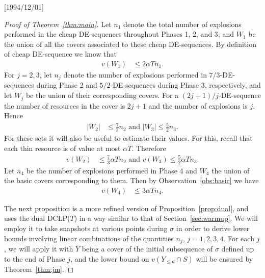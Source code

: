\NeedsTeXFormat{LaTeX2e}[1994/12/01]\documentclass[letterpaper, 11pt]{article}
\theoremstyle{definition}
\theoremstyle{remark}
\numberwithin{equation}{section}
\begin{document}
\begin{proof}[Proof of Theorem~\ref{thm:main}]
Let $n_1$ denote the total number of explosions performed in the cheap
DE-sequences throughout Phases 1, 2, and 3, and
$W_1$ be the union of all the covers associated to these cheap
DE-sequences. By definition of cheap DE-sequence
we know that
\begin{align}\label{eq:W1}
  v(W_1) & \leq 2\alpha T n_1.
           \end{align}
For $j=2,3$, let  $n_j$ denote the number of explosions performed in
$7/3$-DE-sequences during Phase 2 and $5/2$-DE-sequences during Phase
3, respectively, and let $W_j$ be the union of their corresponding covers.
For a $(2j+1)/j$-DE-sequence the number of resources in the cover is $2j+1$
and the number of explosions is $j$. Hence
\begin{align}\label{eq:Wj-card}
  |W_{2}| & \leq \frac{7}{3}n_{2} \mbox{ and }  |W_{3}| \leq \frac{5}{2}n_{3}. 
\end{align}
For these sets it will also be useful to estimate their values. For
this, recall that each thin resource is of value
at most $\alpha T$. Therefore
\begin{align}\label{eq:Wj-value}
v(W_{2})
             & \leq \frac{7}{3}\alpha T n_{2}  \mbox{ and } v(W_{3})
              \leq \frac{5}{2}\alpha Tn_{3}.
\end{align}
Let $n_4$ be the number of explosions performed in Phase 4 and $W_4$
the union of the basic covers corresponding to them.
Then by Observation~\ref{obs:basic} we have
\begin{align}\label{eq:W4}
  v(W_4) & \leq  3\alpha Tn_4.
\end{align}

The next proposition is a more refined version of
  Proposition~\ref{prop:dual}, and uses the dual DCLP($T$) in a way similar
  to that of Section~\ref{sec:warmup}. We will employ it to take
snapshots at various points 
during $\sigma$ in order to derive lower bounds involving linear
combinations of the quantities $n_j$, $j=1, 2,3,4$. 
 For each $j$, we will apply it with $Y$ being a
  cover of the initial subsequence of $\sigma$ defined up to the end
  of Phase $j$, and the lower bound on $v(Y_{\leq d}\cap S)$ will be
  ensured by Theorem~\ref{thm:jm}.


\end{proof}
\end{document}
